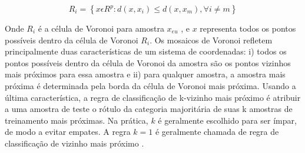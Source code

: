 \begin{equation} \label{eq:celVoroniEncap}
    R_{i}= \left \{ x \epsilon R^{p}: d(x,x_{i})\leq d(x,x_{m}),\forall i\neq m\right \}
\end{equation}

Onde $ R_{i} $ é a célula de Voronoi para amostra $ x_{eu} $ , e $ x $ representa todos os pontos possíveis dentro da célula de Voronoi $ R_{i} $. Os mosaicos de Voronoi refletem principalmente duas características de um sistema de coordenadas: i) todos os pontos possíveis dentro da célula de Voronoi da amostra são os pontos vizinhos mais próximos para essa amostra e ii) para qualquer amostra, a amostra mais próxima é determinada pela borda da célula de Voronoi mais próxima. Usando a última característica, a regra de classificação de k-vizinho mais próximo é atribuir a uma amostra de teste o rótulo da categoria majoritária de suas k amostras de treinamento mais próximas. Na prática, $ k $ é geralmente escolhido para ser ímpar, de modo a evitar empates. A regra $ k = 1 $ é geralmente chamada de regra de classificação de vizinho mais próximo \cite{peterson2009k}.